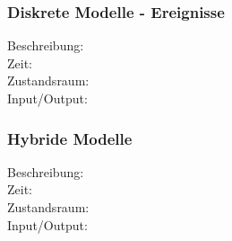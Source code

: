 \documentclass[11pt, fleqn, a4paper, leqno]{scrartcl} %
\begin{document}
		\subsubsection{Diskrete Modelle - Ereignisse}
			\begin{description}
				\item[Beschreibung:]
				\item[Zeit:]
				\item[Zustandsraum:]
				\item[Input/Output:]
			\end{description}
		\subsubsection{Hybride Modelle}
			\begin{description}
				\item[Beschreibung:]
				\item[Zeit:]
				\item[Zustandsraum:]
				\item[Input/Output:]
			\end{description}
\end{document}
